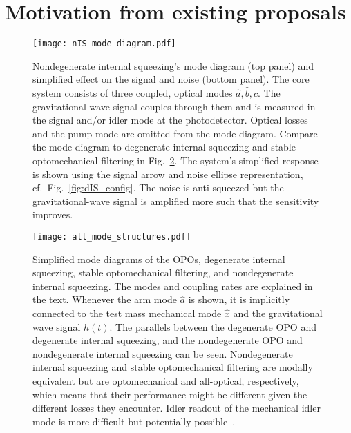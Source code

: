 \section{Motivation from existing proposals}
\label{sec:modal_equivalence}

\begin{figure}
    \centering
    \texttt{[image: nIS\_mode\_diagram.pdf]}
    \caption{ Nondegenerate internal squeezing's mode diagram (top panel) and simplified effect on the signal and noise (bottom panel). The core system consists of three coupled, optical modes $\hat a,\hat b,\hat c$. The gravitational-wave signal couples through them and is measured in the signal and/or idler mode at the photodetector. Optical losses and the pump mode are omitted from the mode diagram. Compare the mode diagram to degenerate internal squeezing and stable optomechanical filtering in Fig.~\ref{fig:mode_diagram}. The system's simplified response is shown using the signal arrow and noise ellipse representation, cf.\ Fig.~\ref{fig:dIS_config}. The noise is anti-squeezed but the gravitational-wave signal is amplified more such that the sensitivity improves.}
    \label{fig:nIS_mode_diagram}
\end{figure}
\begin{figure}
    \centering
    \texttt{[image: all\_mode\_structures.pdf]}
    \caption{Simplified mode diagrams of the OPOs, degenerate internal squeezing, stable optomechanical filtering, and nondegenerate internal squeezing. The modes and coupling rates are explained in the text. Whenever the arm mode $\hat a$ is shown, it is implicitly connected to the test mass mechanical mode $\hat x$ and the gravitational wave signal $h(t)$. The parallels between the degenerate OPO and degenerate internal squeezing, and the nondegenerate OPO and nondegenerate internal squeezing can be seen. Nondegenerate internal squeezing and stable optomechanical filtering are modally equivalent but are optomechanical and all-optical, respectively, which means that their performance might be different given the different losses they encounter. Idler readout of the mechanical idler mode is more difficult but potentially possible~\cite{liEnhancingInterferometerSensitivity2021}.}
    \label{fig:mode_diagram}
\end{figure}

